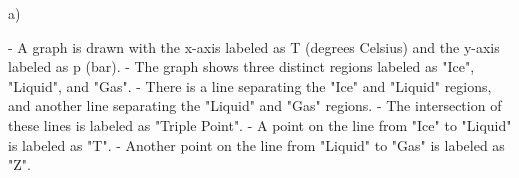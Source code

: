 a)

- A graph is drawn with the x-axis labeled as T (degrees Celsius) and the y-axis labeled as p (bar).
- The graph shows three distinct regions labeled as "Ice", "Liquid", and "Gas".
- There is a line separating the "Ice" and "Liquid" regions, and another line separating the "Liquid" and "Gas" regions.
- The intersection of these lines is labeled as "Triple Point".
- A point on the line from "Ice" to "Liquid" is labeled as "T".
- Another point on the line from "Liquid" to "Gas" is labeled as "Z".